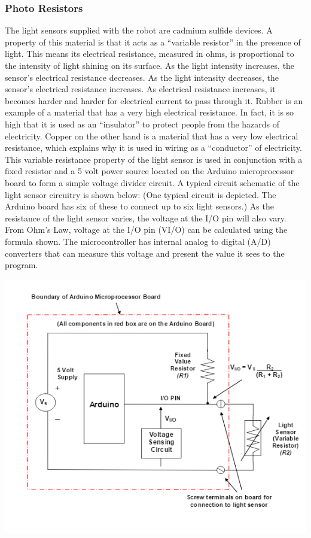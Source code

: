 \documentclass{article}
\begin{document}
    \subsubsection{Photo Resistors}
    The light sensors supplied with the robot are cadmium sulfide devices.  A property of this material is that it acts as a “variable resistor” in the presence of light.  This means its electrical resistance, measured in ohms, is proportional to the intensity of light shining on its surface.  As the light intensity increases, the sensor’s electrical resistance decreases.  As the light intensity decreases, the sensor’s electrical resistance increases.   As electrical resistance increases, it becomes harder and harder for electrical current to pass through it.   Rubber is an example of a material that has a very high electrical resistance. In fact, it is so high that it is used as an “insulator” to protect people from the hazards of electricity. Copper on the other hand is a material that has a very low electrical resistance, which explains why it is used in wiring as a “conductor” of electricity.\\

    This variable resistance property of the light sensor is used in conjunction with a fixed resistor and a 5 volt power source located on the Arduino microprocessor board to form a simple voltage divider circuit. A typical circuit schematic of the light sensor circuitry is shown below:  (One typical circuit is depicted. The Arduino board has six of these to connect up to six light sensors.)  As the resistance of the light sensor varies, the voltage at the I/O pin will also vary.  From Ohm’s Law, voltage at the I/O pin (VI/O) can be calculated using the formula shown.  The microcontroller has internal analog to digital (A/D) converters that can measure this voltage and present the value it sees to the program.
    
    \begin{center}
    \includegraphics[]{Photoresistor.png}
    \end{center}
    
\end{document}
